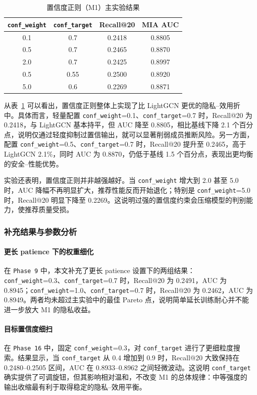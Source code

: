 \begin{table}[htbp]
\centering
\caption{置信度正则（M1）主实验结果}
\label{tab:m1-main}
\begin{tabular}{cccc}
\hline
\texttt{conf\_weight} & \texttt{conf\_target} & Recall@20 & MIA AUC \\
\hline
0.1 & 0.7  & 0.2418 & 0.8805 \\
0.5 & 0.7  & 0.2465 & 0.8870 \\
2.0 & 0.7  & 0.2425 & 0.8997 \\
0.5 & 0.55 & 0.2500 & 0.8920 \\
5.0 & 0.6  & 0.2269 & 0.8871 \\
\hline
\end{tabular}
\end{table}

从表~\ref{tab:m1-main} 可以看出，置信度正则整体上实现了比 LightGCN 更优的隐私--效用折中。具体而言，轻量配置 \texttt{conf\_weight}=0.1、\texttt{conf\_target}=0.7 时，Recall@20 为 0.2418，与 LightGCN 基本持平，但 AUC 降至 0.8805，相比基线下降 2.1 个百分点，说明仅通过轻度抑制过置信输出，就可以显著削弱成员推断风险。另一方面，配置 \texttt{conf\_weight}=0.5、\texttt{conf\_target}=0.7 时，Recall@20 提升至 0.2465，高于 LightGCN 2.1\%，同时 AUC 为 0.8870，仍低于基线 1.5 个百分点，表现出更均衡的安全--性能优势。

实验还表明，置信度正则并非越强越好。当 \texttt{conf\_weight} 增大到 2.0 甚至 5.0 时，AUC 降幅不再明显扩大，推荐性能反而开始退化；特别是 \texttt{conf\_weight}=5.0 时，Recall@20 明显下降至 0.2269。这说明过强的置信度约束会压缩模型的判别能力，使推荐质量受损。

\subsubsection{补充结果与参数分析}
\paragraph{更长 patience 下的权重细化}
在 \texttt{Phase 9} 中，本文补充了更长 patience 设置下的两组结果：\texttt{conf\_weight}=0.3、\texttt{conf\_target}=0.7 时，Recall@20 为 0.2491，AUC 为 0.8945；\texttt{conf\_weight}=1.0、\texttt{conf\_target}=0.7 时，Recall@20 为 0.2462，AUC 为 0.8949。两者均未超过主实验中的最佳 Pareto 点，说明简单延长训练耐心并不能进一步放大 M1 的隐私收益。

\paragraph{目标置信度细扫}
在 \texttt{Phase 16} 中，固定 \texttt{conf\_weight}=0.3，对 \texttt{conf\_target} 进行了更细粒度搜索。结果显示，当 \texttt{conf\_target} 从 0.4 增加到 0.9 时，Recall@20 大致保持在 0.2480--0.2505 区间，AUC 在 0.8933--0.8962 之间轻微波动。这说明 \texttt{conf\_target} 确实提供了可调旋钮，但其影响相对温和，不改变 M1 的总体规律：中等强度的输出收缩最有利于取得稳定的隐私--效用平衡。

